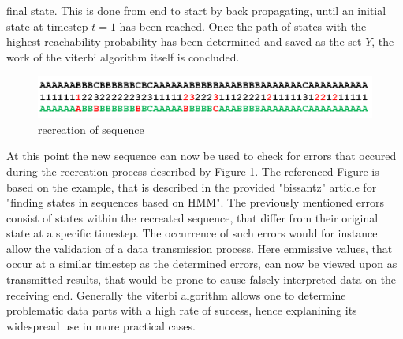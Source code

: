 \documentclass[12pt,journal,compsoc]{IEEEtran}
\begin{document}
final state. This is done from end to start by back propagating, until an initial state at timestep $t=1$ has been reached.
Once the path of states with the highest reachability probability has been determined and saved as the set $Y$, the work of the viterbi algorithm itself is concluded.
\begin{figure}[H]
	\centering
	\includegraphics[scale=0.25]{figures/reconstruction.png}
	\caption{recreation of sequence \cite{article:bissantz}}
	\label{figRecreation}
\end{figure}
At this point the new sequence can now be used to check for errors that occured during the recreation process
described by Figure \ref{figRecreation}. The referenced Figure is based on the example, that is described in the
provided "bissantz" \cite{article:bissantz} article for "finding states in sequences based on HMM". The previously
mentioned errors consist of states within the recreated sequence, that differ from their original state at a specific
timestep. The occurrence of such errors would for instance allow the validation of a data transmission process. Here
emmissive values, that occur at a similar timestep as the determined errors, can now be viewed upon as transmitted
results, that would be prone to cause falsely interpreted data on the receiving end. Generally the viterbi algorithm
allows one to determine problematic data parts with a high rate of success, hence explanining its widespread use in
more practical cases.
\end{document}
